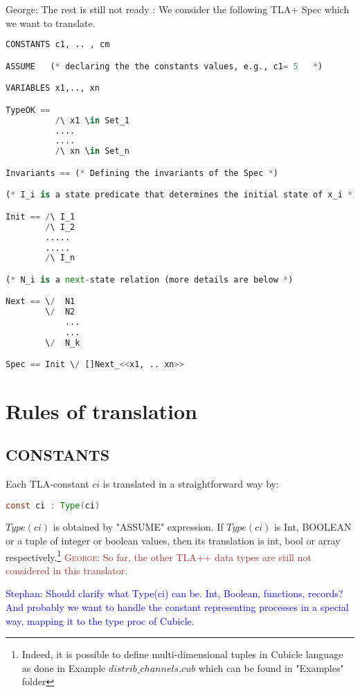\documentclass{article}
\theoremstyle{plain}
\numberwithin{equation}{section}
\newcommand{\george}[1]{\textcolor{brown}{\textsc{George: } {\sf #1}}}
\newcommand{\ste}[1]{\par\noindent\textcolor{blue}{\small Stephan: #1}}
\begin{document}
\color{red} George: The rest is still not ready : 
We consider the following TLA+ Spec which we want to translate.

\begin{lstlisting}[language=Python]
CONSTANTS c1, .. , cm

ASSUME   (* declaring the the constants values, e.g., c1= 5   *)  

VARIABLES x1,.., xn

TypeOK == 
          /\ x1 \in Set_1
          ....
          ....
          /\ xn \in Set_n

Invariants == (* Defining the invariants of the Spec *)           

(* I_i is a state predicate that determines the initial state of x_i *)

Init == /\ I_1    
        /\ I_2 
        .....
        .....
        /\ I_n 

(* N_i is a next-state relation (more details are below *)

Next == \/  N1 
        \/  N2 
            ...
            ...
        \/  N_k 

Spec == Init \/ []Next_<<x1, .. xn>>        
\end{lstlisting}
 

\section*{Rules of translation}

 
\subsection{CONSTANTS} Each TLA-constant $ci$ is  translated in a straightforward  way  by:  
   
\begin{lstlisting}[language=Java]
const ci : Type(ci) 
\end{lstlisting}

\emph{$Type(ci)$} is obtained by "ASSUME" expression. If \emph{$Type(ci)$} is Int, BOOLEAN or a tuple of integer or boolean values, then its translation is int,  bool or array respectively.\footnote{Indeed, it is possible to define multi-dimensional tuples in Cubicle language as done in Example \emph{$distrib\_channels.cub$} which can be found in "Examples" folder} \george{So far, the other TLA++ data types are still not considered in this translator.  }  

\ste{Should clarify what Type(ci) can be. Int, Boolean, functions, records? And
  probably we want to handle the constant representing processes in a special
  way, mapping it to the type proc of Cubicle.}
\end{document}
